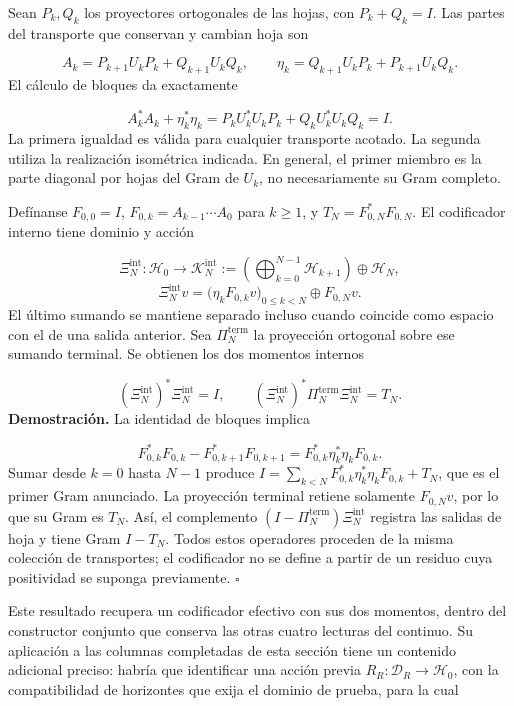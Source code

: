 Sean \(P_k,Q_k\) los proyectores ortogonales de las hojas, con \(P_k+Q_k=I\). Las partes del transporte que conservan y cambian hoja son

\[
A_k=P_{k+1}U_kP_k+Q_{k+1}U_kQ_k,
\qquad
\eta_k=Q_{k+1}U_kP_k+P_{k+1}U_kQ_k.
\]
El cálculo de bloques da exactamente

\[
A_k^*A_k+\eta_k^*\eta_k
=P_kU_k^*U_kP_k+Q_kU_k^*U_kQ_k=I.
\]
La primera igualdad es válida para cualquier transporte acotado. La segunda utiliza la realización isométrica indicada. En general, el primer miembro es la parte diagonal por hojas del Gram de \(U_k\), no necesariamente su Gram completo.

Defínanse \(F_{0,0}=I\), \(F_{0,k}=A_{k-1}\cdots A_0\) para \(k\geq1\), y \(T_N=F_{0,N}^*F_{0,N}\). El codificador interno tiene dominio y acción

\[
\Xi_N^{\mathrm{int}}:\mathscr H_0\longrightarrow
\mathscr K_N^{\mathrm{int}}
:=\left(\bigoplus_{k=0}^{N-1}\mathscr H_{k+1}\right)\oplus\mathscr H_N,
\]
\[
\Xi_N^{\mathrm{int}}v
=\bigl(\eta_kF_{0,k}v\bigr)_{0\leq k<N}\oplus F_{0,N}v.
\]
El último sumando se mantiene separado incluso cuando coincide como espacio con el de una salida anterior. Sea \(\Pi_N^{\mathrm{term}}\) la proyección ortogonal sobre ese sumando terminal. Se obtienen los dos momentos internos

\[
(\Xi_N^{\mathrm{int}})^*\Xi_N^{\mathrm{int}}=I,
\qquad
(\Xi_N^{\mathrm{int}})^*\Pi_N^{\mathrm{term}}\Xi_N^{\mathrm{int}}=T_N.
\]
\textbf{Demostración.} La identidad de bloques implica

\[
F_{0,k}^*F_{0,k}-F_{0,k+1}^*F_{0,k+1}
=F_{0,k}^*\eta_k^*\eta_kF_{0,k}.
\]
Sumar desde \(k=0\) hasta \(N-1\) produce \(I=\sum_{k<N}F_{0,k}^*\eta_k^*\eta_kF_{0,k}+T_N\), que es el primer Gram anunciado. La proyección terminal retiene solamente \(F_{0,N}v\), por lo que su Gram es \(T_N\). Así, el complemento \((I-\Pi_N^{\mathrm{term}})\Xi_N^{\mathrm{int}}\) registra las salidas de hoja y tiene Gram \(I-T_N\). Todos estos operadores proceden de la misma colección de transportes; el codificador no se define a partir de un residuo cuya positividad se suponga previamente. \hfill\(\square\)

Este resultado recupera un codificador efectivo con sus dos momentos, dentro del constructor conjunto que conserva las otras cuatro lecturas del continuo. Su aplicación a las columnas completadas de esta sección tiene un contenido adicional preciso: habría que identificar una acción previa \(R_R:\mathcal D_R\to\mathscr H_0\), con la compatibilidad de horizontes que exija el dominio de prueba, para la cual


